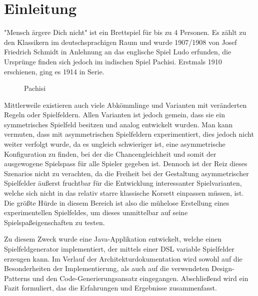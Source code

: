 \documentclass[conference]{IEEEtran}
\begin{document}
\section{Einleitung}
"Mensch \"argere Dich nicht" ist ein Brettspiel f\"ur bis zu 4 Personen. Es z\"ahlt zu den Klassikern im deutschsprachigen Raum und wurde 1907/1908 von Josef Friedrich Schmidt in Anlehnung an das englische Spiel Ludo erfunden, die Urspr\"unge finden sich jedoch im indischen Spiel Pachisi. Erstmals 1910 erschienen, ging es 1914 in Serie. 
\begin{figure}[]
    \centering
    \caption{Pachisi}
\end{figure}
Mittlerweile existieren auch viele Abk\"ommlinge und Varianten mit ver\"anderten Regeln oder Spielfeldern. Allen Varianten ist jedoch gemein, dass sie ein symmetrisches Spielfeld besitzen und analog entwickelt wurden. Man kann vermuten, dass mit asymmetrischen Spielfeldern experimentiert, dies jedoch
nicht weiter verfolgt wurde, da es ungleich schwieriger ist, eine asymmetrische Konfiguration zu finden, bei der die Chancengleichheit und somit der ausgewogene
Spielspass f\"ur alle Spieler gegeben ist. Dennoch ist der Reiz dieses Szenarios nicht zu verachten, da die Freiheit bei der Gestaltung asymmetrischer Spielfelder
\"au\ss erst fruchtbar f\"ur die Entwicklung interessanter Spielvarianten, welche sich nicht in das relativ starre klassische Korsett einpassen m\"ussen, ist. Die gr\"o\ss te
H\"urde in diesem Bereich ist also die m\"uhelose Erstellung eines experimentellen Spielfeldes, um dieses unmittelbar auf seine Spielspa\ss eigenschaften zu testen.

Zu diesem Zweck wurde eine Java-Applikation entwickelt, welche einen Spielfeldgenerator implementiert, der mittels einer DSL variable Spielfelder erzeugen kann. Im Verlauf der Architekturdokumentation wird sowohl auf die Besonderheiten der Implementierung, als auch auf die verwendeten Design-Patterns und den Code-Generierungsansatz eingegangen. Abschlie\ss end wird ein Fazit formuliert, das die Erfahrungen und Ergebnisse zusammenfasst.
\end{document}
